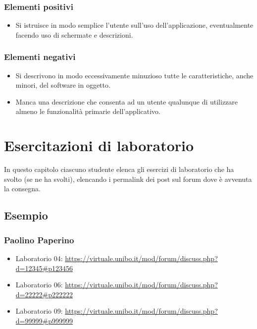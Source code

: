 \documentclass[a4paper,12pt]{report}
\begin{document}
\subsection*{Elementi positivi}

\begin{itemize}
 \item Si istruisce in modo semplice l'utente sull'uso dell'applicazione, eventualmente facendo uso di schermate e descrizioni.
\end{itemize}

\subsection*{Elementi negativi}
\begin{itemize}
 \item Si descrivono in modo eccessivamente minuzioso tutte le caratteristiche, anche minori, del software in oggetto.
 \item Manca una descrizione che consenta ad un utente qualunque di utilizzare almeno le funzionalità primarie dell'applicativo.
\end{itemize}

\chapter{Esercitazioni di laboratorio}

In questo capitolo ciascuno studente elenca gli esercizi di laboratorio che ha svolto
(se ne ha svolti),
elencando i permalink dei post sul forum dove è avvenuta la consegna.

\section*{Esempio}

\subsection{Paolino Paperino}

\begin{itemize}
 \item Laboratorio 04: \url{https://virtuale.unibo.it/mod/forum/discuss.php?d=12345#p123456}
 \item Laboratorio 06: \url{https://virtuale.unibo.it/mod/forum/discuss.php?d=22222#p222222}
 \item Laboratorio 09: \url{https://virtuale.unibo.it/mod/forum/discuss.php?d=99999#p999999}
\end{itemize}
\end{document}
